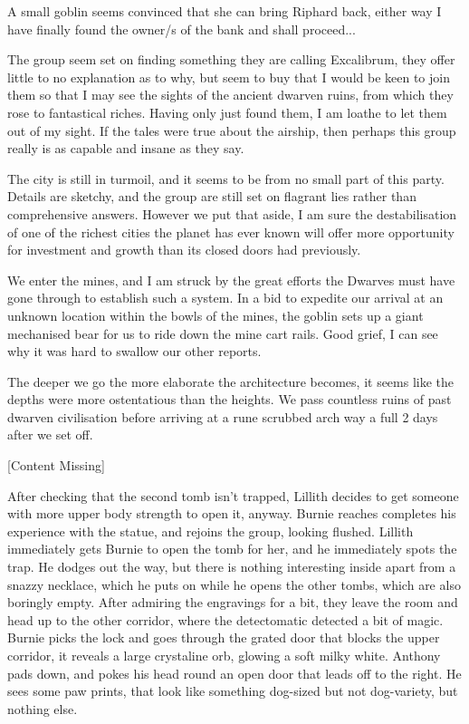 \begin{multicols}{2}
{A small goblin seems convinced that she can bring Riphard back, either way I have finally found the owner/s of the bank and shall proceed...

The group seem set on finding something they are calling Excalibrum, they offer little to no explanation as to why, but seem to buy that I would be keen to join them so that I may see the sights of the ancient dwarven ruins, from which they rose to fantastical riches. Having only just found them, I am loathe to let them out of my sight. If the tales were true about the airship, then perhaps this group really is as capable and insane as they say.

The city is still in turmoil, and it seems to be from no small part of this party. Details are sketchy, and the group are still set on flagrant lies rather than comprehensive answers. However we put that aside, I am sure the destabilisation of one of the richest cities the planet has ever known will offer more opportunity for investment and growth than its closed doors had previously.

We enter the mines, and I am struck by the great efforts the Dwarves must have gone through to establish such a system. In a bid to expedite our arrival at an unknown location within the bowls of the mines, the goblin sets up a giant mechanised bear for us to ride down the mine cart rails. Good grief, I can see why it was hard to swallow our other reports.

The deeper we go the more elaborate the architecture becomes, it seems like the depths were more ostentatious than the heights. We pass countless ruins of past dwarven civilisation before arriving at a rune scrubbed arch way a full 2 days after we set off.

[Content Missing]
}\medskip

After checking that the second tomb isn’t trapped, Lillith decides to get someone with more upper body strength to open it, anyway. Burnie reaches completes his experience with the statue, and rejoins the group, looking flushed. Lillith immediately gets Burnie to open the tomb for her, and he immediately spots the trap. He dodges out the way, but there is nothing interesting inside apart from a snazzy necklace, which he puts on while he opens the other tombs, which are also boringly empty. After admiring the engravings for a bit, they leave the room and head up to the other corridor, where the detectomatic detected a bit of magic. Burnie picks the lock and goes through the grated door that blocks the upper corridor, it reveals a large crystaline orb, glowing a soft milky white. Anthony pads down, and pokes his head round an open door that leads off to the right. He sees some paw prints, that look like something dog-sized but not dog-variety, but nothing else.\medskip


\end{multicols}
